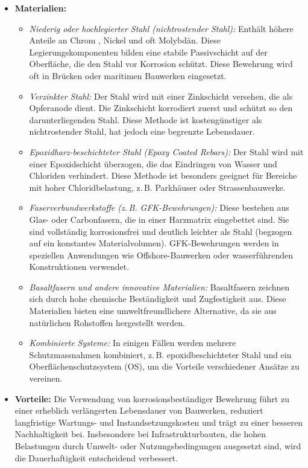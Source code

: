\documentclass[
11pt,
captions=tableheading,
headsepline,
footsepline, 
captions=tableheading,
parskip=half-,
]{scrartcl}
\begin{document}
\begin{itemize}
    \item \textbf{Materialien:}
    \begin{itemize}
        \item \textit{Niederig oder hochlegierter Stahl (nichtrostender Stahl):} Enthält höhere Anteile an Chrom , Nickel und oft Molybdän. Diese Legierungskomponenten bilden eine stabile Passivschicht auf der Oberfläche, die den Stahl vor Korrosion schützt. Diese Bewehrung wird oft in Brücken oder maritimen Bauwerken eingesetzt.
        \item \textit{Verzinkter Stahl:} Der Stahl wird mit einer Zinkschicht versehen, die als Opferanode dient. Die Zinkschicht korrodiert zuerst und schützt so den darunterliegenden Stahl. Diese Methode ist kostengünstiger als nichtrostender Stahl, hat jedoch eine begrenzte Lebensdauer.
        \item \textit{Epoxidharz-beschichteter Stahl (Epoxy Coated Rebars):} Der Stahl wird mit einer Epoxidschicht überzogen, die das Eindringen von Wasser und Chloriden verhindert. Diese Methode ist besonders geeignet für Bereiche mit hoher Chloridbelastung, z.\,B. Parkhäuser oder Strassenbauwerke.
        \item \textit{Faserverbundwerkstoffe (z.\,B. GFK-Bewehrungen):} Diese bestehen aus Glas- oder Carbonfasern, die in einer Harzmatrix eingebettet sind. Sie sind vollständig korrosionsfrei und deutlich leichter als Stahl (begzogen auf ein konstantes Materialvolumen). GFK-Bewehrungen werden in speziellen Anwendungen wie Offshore-Bauwerken oder wasserführenden Konstruktionen verwendet.
        \item \textit{Basaltfasern und andere innovative Materialien:} Basaltfasern zeichnen sich durch hohe chemische Beständigkeit und Zugfestigkeit aus. Diese Materialien bieten eine umweltfreundlichere Alternative, da sie aus natürlichen Rohstoffen hergestellt werden.
        \item \textit{Kombinierte Systeme:} In einigen Fällen werden mehrere Schutzmassnahmen kombiniert, z.\,B. epoxidbeschichteter Stahl und ein Oberflächenschutzsystem (OS), um die Vorteile verschiedener Ansätze zu vereinen.
    \end{itemize}
    
    \item \textbf{Vorteile:} Die Verwendung von korrosionsbeständiger Bewehrung führt zu einer erheblich verlängerten Lebensdauer von Bauwerken, reduziert langfristige Wartungs- und Instandsetzungskosten und trägt zu einer besseren Nachhaltigkeit bei. Insbesondere bei Infrastrukturbauten, die hohen Belastungen durch Umwelt- oder Nutzungsbedingungen ausgesetzt sind, wird die Dauerhaftigkeit entscheidend verbessert.
    

\end{itemize}
\end{document}
